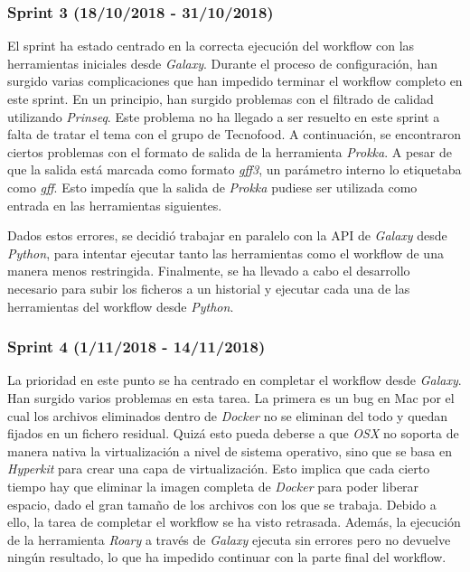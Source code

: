 \subsubsection{Sprint 3 (18/10/2018 - 31/10/2018)}
El sprint ha estado centrado en la correcta ejecución del workflow con las herramientas iniciales desde \textit{Galaxy}. Durante el proceso de configuración, han surgido varias complicaciones que han impedido terminar el workflow completo en este sprint. 
En un principio, han surgido problemas con el filtrado de calidad utilizando \textit{Prinseq}. Este problema no ha llegado a ser resuelto en este sprint a falta de tratar el tema con el grupo de Tecnofood.
A continuación, se encontraron ciertos problemas con el formato de salida de la herramienta \textit{Prokka}. A pesar de que la salida está marcada como formato \textit{gff3}, un parámetro interno lo etiquetaba como \textit{gff}. Esto impedía que la salida de \textit{Prokka} pudiese ser utilizada como entrada en las herramientas siguientes.

Dados estos errores, se decidió trabajar en paralelo con la API de \textit{Galaxy} desde \textit{Python}, para intentar ejecutar tanto las herramientas como el workflow de una manera menos restringida. Finalmente, se ha llevado a cabo el desarrollo necesario para subir los ficheros a un historial y ejecutar cada una de las herramientas del workflow desde \textit{Python}.

\subsubsection{Sprint 4 (1/11/2018 - 14/11/2018)}
La prioridad en este punto se ha centrado en completar el workflow desde \textit{Galaxy}. Han surgido varios problemas en esta tarea. La primera es un bug en Mac por el cual los archivos eliminados dentro de \textit{Docker} no se eliminan del todo y quedan fijados en un fichero residual. Quizá esto pueda deberse a que \textit{OSX} no soporta de manera nativa la virtualización a nivel de sistema operativo, sino que se basa en \textit{Hyperkit} para crear una capa de virtualización. Esto implica que cada cierto tiempo hay que eliminar la imagen completa de \textit{Docker} para poder liberar espacio, dado el gran tamaño de los archivos con los que se trabaja. Debido a ello, la tarea de completar el workflow se ha visto retrasada. Además, la ejecución de la herramienta \textit{Roary} a través de \textit{Galaxy} ejecuta sin errores pero no devuelve ningún resultado, lo que ha impedido continuar con la parte final del workflow. 


